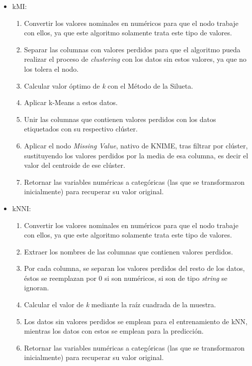 \begin{itemize}
	\item kMI:
	\begin{enumerate}
		\item Convertir los valores nominales en numéricos para que el nodo trabaje con ellos, ya que este algoritmo solamente trata este tipo de valores.
		\item Separar las columnas con valores perdidos para que el algoritmo pueda realizar el proceso de \textit{clustering} con los datos sin estos valores, ya que no los tolera el nodo.
		\item Calcular valor óptimo de \textit{k} con el Método de la Silueta.
		\item Aplicar k-Means a estos datos.
		\item Unir las columnas que contienen valores perdidos con los datos etiquetados con su respectivo clúster.
		\item Aplicar el nodo \textit{Missing Value}, nativo de KNIME, tras filtrar por clúster, sustituyendo los valores perdidos por la media de esa columna, es decir el valor del centroide de ese clúster.
		\item Retornar las variables numéricas a categóricas (las que se transformaron inicialmente) para recuperar su valor original.
	\end{enumerate}
	\item kNNI:
	\begin{enumerate}
		\item Convertir los valores nominales en numéricos para que el nodo trabaje con ellos, ya que este algoritmo solamente trata este tipo de valores.
		\item Extraer los nombres de las columnas que contienen valores perdidos.
		\item Por cada columna, se separan los valores perdidos del resto de los datos, éstos se reemplazan por 0 si son numéricos, si son de tipo \textit{string} se ignoran.
		\item Calcular el valor de \textit{k} mediante la raíz cuadrada de la muestra. 
		\item Los datos sin valores perdidos se emplean para el entrenamiento de kNN, mientras los datos con estos se emplean para la predicción.
		\item Retornar las variables numéricas a categóricas (las que se transformaron inicialmente) para recuperar su valor original.
	\end{enumerate}
\end{itemize}


